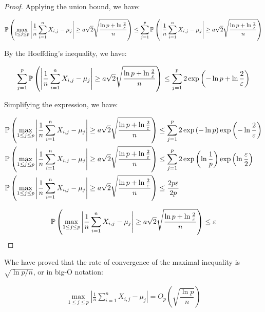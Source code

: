 \begin{proof}

Applying the union bound, we have:

\begin{align*}
\mathbb{P}\left(
    \max_{1 \leq j \leq p}{
        \left|
            \frac{1}{n} \sum_{i=1}^{n} X_{i,j} - \mu_{j}
        \right|
    }
    \geq
    a \sqrt{2} \sqrt{
        \dfrac{\ln p + \ln \frac{2}{\varepsilon}}{n}
    }
\right)
\leq
\sum_{j=1}^{p} \mathbb{P}\left(
    \left|
        \frac{1}{n} \sum_{i=1}^{n} X_{i,j} - \mu_{j}
    \right|
    \geq
    a \sqrt{2} \sqrt{
        \dfrac{\ln p + \ln \frac{2}{\varepsilon}}{n}
    }
\right)
\end{align*}

By the Hoeffding's inequality, we have:

\begin{align*}
\sum_{j=1}^{p} \mathbb{P}\left(
    \left|
        \frac{1}{n} \sum_{i=1}^{n} X_{i,j} - \mu_{j}
    \right|
    \geq
    a \sqrt{2} \sqrt{
        \dfrac{\ln p + \ln \frac{2}{\varepsilon}}{n}
    }
\right)
\leq
\sum_{j=1}^{p} 2 \exp{\left(
    - \ln p + \ln \frac{2}{\varepsilon}
\right)}
\end{align*}

Simplifying the expression, we have:

\begin{align*}
\mathbb{P}\left(
    \max_{1 \leq j \leq p}{
        \left|
            \frac{1}{n} \sum_{i=1}^{n} X_{i,j} - \mu_{j}
        \right|
    }
    \geq
    a \sqrt{2} \sqrt{
        \dfrac{\ln p + \ln \frac{2}{\varepsilon}}{n}
    }
\right)
&\leq
\sum_{j = 1}^{p} 2 \exp\left(- \ln p\right) \exp\left(- \ln \frac{2}{\varepsilon}\right) \\
\mathbb{P}\left(
    \max_{1 \leq j \leq p}{
        \left|
            \frac{1}{n} \sum_{i=1}^{n} X_{i,j} - \mu_{j}
        \right|
    }
    \geq
    a \sqrt{2} \sqrt{
        \dfrac{\ln p + \ln \frac{2}{\varepsilon}}{n}
    }
\right)
&\leq
\sum_{j = 1}^{p} 2 \exp\left(\ln \frac{1}{p}\right) \exp\left(\ln \frac{\varepsilon}{2}\right) \\
\mathbb{P}\left(
    \max_{1 \leq j \leq p}{
        \left|
            \frac{1}{n} \sum_{i=1}^{n} X_{i,j} - \mu_{j}
        \right|
    }
    \geq
    a \sqrt{2} \sqrt{
        \dfrac{\ln p + \ln \frac{2}{\varepsilon}}{n}
    }
\right)
&\leq
\dfrac{2 p \varepsilon}{ 2 p}
\end{align*}

\begin{align*}
\mathbb{P}\left(
    \max_{1 \leq j \leq p}{
        \left|
            \frac{1}{n} \sum_{i=1}^{n} X_{i,j} - \mu_{j}
        \right|
    }
    \geq
    a \sqrt{2} \sqrt{
        \dfrac{\ln p + \ln \frac{2}{\varepsilon}}{n}
    }
\right)
\leq \varepsilon 
\end{align*}

\end{proof}

Whe have proved that the rate of convergence of the maximal inequality is $\sqrt{\ln p / n}$, or in big-O notation:

\begin{align*}
\max_{1 \leq j \leq p}{
    \left|
        \frac{1}{n} \sum_{i=1}^{n} X_{i,j} - \mu_{j}
    \right|
} = O_p \left(
    \sqrt{\dfrac{\ln p}{n}}
\right)
\end{align*}